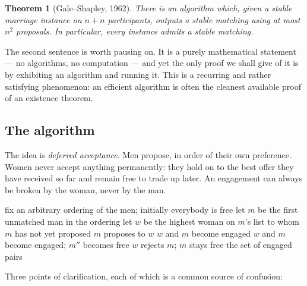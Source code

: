 \documentclass[11pt,a4paper]{article}
\theoremstyle{plain}
\newtheorem{theorem}{Theorem}[section]
\theoremstyle{definition}
\theoremstyle{remark}
\begin{document}
\begin{theorem}[Gale--Shapley, 1962]\label{thm:main}
There is an algorithm which, given a stable marriage instance on $n{+}n$
participants, outputs a stable matching using at most $n^2$ proposals. In
particular, every instance admits a stable matching.
\end{theorem}

The second sentence is worth pausing on. It is a purely mathematical
statement --- no algorithms, no computation --- and yet the only proof we
shall give of it is by exhibiting an algorithm and running it. This is a
recurring and rather satisfying phenomenon: an efficient algorithm is often
the cleanest available proof of an existence theorem.

\subsection{The algorithm}

The idea is \emph{deferred acceptance}. Men propose, in order of their own
preference. Women never accept anything permanently: they hold on to the best
offer they have received so far and remain free to trade up later. An
engagement can always be broken by the woman, never by the man.

\begin{algorithm}[ht]
\caption{Gale--Shapley (men proposing)}
\label{alg:gs}
\begin{algorithmic}[1]
  \State fix an arbitrary ordering of the men; initially everybody is free
    \State let $m$ be the first unmatched man in the ordering
    \State let $w$ be the highest woman on $m$'s list to whom $m$ has not
           yet proposed
    \State $m$ proposes to $w$
      \State $w$ and $m$ become engaged
      \State $w$ and $m$ become engaged; $m''$ becomes free
    \Else
      \State $w$ rejects $m$; $m$ stays free
    \EndIf
  \EndWhile
  \State \Return the set of engaged pairs
\end{algorithmic}
\end{algorithm}

Three points of clarification, each of which is a common source of confusion:
\end{document}
